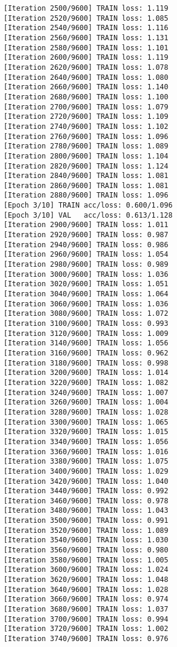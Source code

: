 \documentclass[11pt]{article}
\begin{document}
\begin{Verbatim}[commandchars=\\\{\}]
[Iteration 2500/9600] TRAIN loss: 1.119
[Iteration 2520/9600] TRAIN loss: 1.085
[Iteration 2540/9600] TRAIN loss: 1.116
[Iteration 2560/9600] TRAIN loss: 1.131
[Iteration 2580/9600] TRAIN loss: 1.101
[Iteration 2600/9600] TRAIN loss: 1.119
[Iteration 2620/9600] TRAIN loss: 1.078
[Iteration 2640/9600] TRAIN loss: 1.080
[Iteration 2660/9600] TRAIN loss: 1.140
[Iteration 2680/9600] TRAIN loss: 1.100
[Iteration 2700/9600] TRAIN loss: 1.079
[Iteration 2720/9600] TRAIN loss: 1.109
[Iteration 2740/9600] TRAIN loss: 1.102
[Iteration 2760/9600] TRAIN loss: 1.096
[Iteration 2780/9600] TRAIN loss: 1.089
[Iteration 2800/9600] TRAIN loss: 1.104
[Iteration 2820/9600] TRAIN loss: 1.124
[Iteration 2840/9600] TRAIN loss: 1.081
[Iteration 2860/9600] TRAIN loss: 1.081
[Iteration 2880/9600] TRAIN loss: 1.096
[Epoch 3/10] TRAIN acc/loss: 0.600/1.096
[Epoch 3/10] VAL   acc/loss: 0.613/1.128
[Iteration 2900/9600] TRAIN loss: 1.011
[Iteration 2920/9600] TRAIN loss: 0.987
[Iteration 2940/9600] TRAIN loss: 0.986
[Iteration 2960/9600] TRAIN loss: 1.054
[Iteration 2980/9600] TRAIN loss: 0.989
[Iteration 3000/9600] TRAIN loss: 1.036
[Iteration 3020/9600] TRAIN loss: 1.051
[Iteration 3040/9600] TRAIN loss: 1.064
[Iteration 3060/9600] TRAIN loss: 1.036
[Iteration 3080/9600] TRAIN loss: 1.072
[Iteration 3100/9600] TRAIN loss: 0.993
[Iteration 3120/9600] TRAIN loss: 1.009
[Iteration 3140/9600] TRAIN loss: 1.056
[Iteration 3160/9600] TRAIN loss: 0.962
[Iteration 3180/9600] TRAIN loss: 0.998
[Iteration 3200/9600] TRAIN loss: 1.014
[Iteration 3220/9600] TRAIN loss: 1.082
[Iteration 3240/9600] TRAIN loss: 1.007
[Iteration 3260/9600] TRAIN loss: 1.004
[Iteration 3280/9600] TRAIN loss: 1.028
[Iteration 3300/9600] TRAIN loss: 1.065
[Iteration 3320/9600] TRAIN loss: 1.015
[Iteration 3340/9600] TRAIN loss: 1.056
[Iteration 3360/9600] TRAIN loss: 1.016
[Iteration 3380/9600] TRAIN loss: 1.075
[Iteration 3400/9600] TRAIN loss: 1.029
[Iteration 3420/9600] TRAIN loss: 1.040
[Iteration 3440/9600] TRAIN loss: 0.992
[Iteration 3460/9600] TRAIN loss: 0.978
[Iteration 3480/9600] TRAIN loss: 1.043
[Iteration 3500/9600] TRAIN loss: 0.991
[Iteration 3520/9600] TRAIN loss: 1.089
[Iteration 3540/9600] TRAIN loss: 1.030
[Iteration 3560/9600] TRAIN loss: 0.980
[Iteration 3580/9600] TRAIN loss: 1.005
[Iteration 3600/9600] TRAIN loss: 1.024
[Iteration 3620/9600] TRAIN loss: 1.048
[Iteration 3640/9600] TRAIN loss: 1.028
[Iteration 3660/9600] TRAIN loss: 0.974
[Iteration 3680/9600] TRAIN loss: 1.037
[Iteration 3700/9600] TRAIN loss: 0.994
[Iteration 3720/9600] TRAIN loss: 1.002
[Iteration 3740/9600] TRAIN loss: 0.976

\end{Verbatim}
\end{document}
